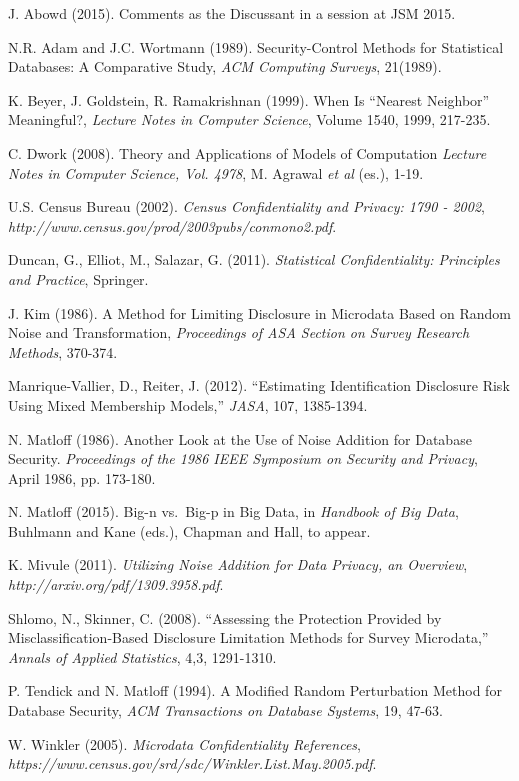 \documentclass[11pt]{article}
\begin{document}
\begin{thebibliography}{}

 J. Abowd (2015). Comments as the Discussant in a session
at JSM 2015.

N.R. Adam and J.C. Wortmann (1989).
Security-Control Methods for Statistical Databases: A Comparative Study,
{\it ACM Computing Surveys}, 21(1989).

 K. Beyer, J. Goldstein, R. Ramakrishnan (1999).  When Is
``Nearest Neighbor'' Meaningful?, {\it Lecture Notes in Computer
Science}, Volume 1540, 1999, 217-235.

 C. Dwork (2008).  Theory and Applications of Models of
Computation {\it Lecture Notes in Computer Science, Vol. 4978}, M.
Agrawal {\it et al} (es.), 1-19.

 U.S. Census Bureau (2002). 
{\it Census Confidentiality and Privacy: 1790 - 2002},
{\it http://www.census.gov/prod/2003pubs/conmono2.pdf}.

 Duncan, G., Elliot, M., Salazar, G. (2011).  {\it
Statistical Confidentiality: Principles and Practice}, Springer. 

 J. Kim (1986).  A Method for Limiting Disclosure in
Microdata Based on Random Noise and Transformation, {\it Proceedings of
ASA Section on Survey Research Methods}, 370-374.

 Manrique-Vallier, D., Reiter, J. (2012).
``Estimating Identification Disclosure Risk Using Mixed Membership
Models,'' {\it JASA}, 107, 1385-1394.

 N. Matloff (1986). Another Look at the Use of
Noise Addition for Database Security. {\it Proceedings of the 1986 IEEE
Symposium on Security and Privacy}, April 1986, pp. 173-180.

  N. Matloff (2015).  Big-n vs.\ Big-p in Big Data,
in {\it Handbook of Big Data}, Buhlmann and Kane (eds.), Chapman and
Hall, to appear.

K. Mivule (2011).  {\it Utilizing Noise Addition for Data Privacy, an 
Overview}, {\it http://arxiv.org/pdf/1309.3958.pdf}.

Shlomo, N., Skinner, C. (2008).
``Assessing the Protection Provided by Misclassification-Based Disclosure
Limitation Methods for Survey Microdata,'' {\it Annals of Applied
Statistics}, 4,3, 1291-1310.

 P. Tendick and N. Matloff (1994).  A Modified Random
Perturbation Method for Database Security, {\it ACM Transactions on
Database Systems}, 19, 47-63.

 W. Winkler (2005). {\it Microdata Confidentiality
References}, {\it
https://www.census.gov/srd/sdc/Winkler.List.May.2005.pdf}.

\end{thebibliography}{}
\end{document}
